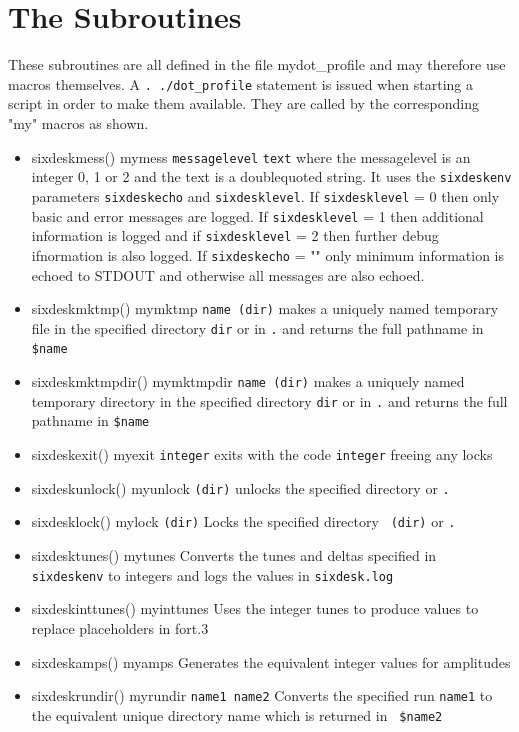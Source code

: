 \documentclass{cernatsnote}
\begin{document}
\section{The Subroutines}
These subroutines are all defined in the file mydot\_profile and may therefore
use macros themselves. A \texttt{. ./dot\_profile} statement is issued when
starting a script in order to make them available.  They are called by the
corresponding "my" macros as shown.
\begin{itemize}
\item sixdeskmess() mymess \texttt{messagelevel} \texttt{text}
where the messagelevel is an integer 0, 1 or 2 and the text is 
a doublequoted string. It uses the \texttt{sixdeskenv} parameters 
\texttt{sixdeskecho} and \texttt{sixdesklevel}. 
If \texttt{sixdesklevel} =  0 then only basic and error messages are logged.
If \texttt{sixdesklevel} = 1 then additional information is logged and if
\texttt{sixdesklevel} = 2 then further debug ifnormation is also logged.
If \texttt{sixdeskecho}  = "" only minimum information is echoed to STDOUT
and otherwise all messages are also echoed.
\item sixdeskmktmp() mymktmp \texttt{name (dir)} makes a uniquely named temporary
  file in the specified directory \texttt{dir} or in \texttt{.} and returns the full
  pathname in \texttt{\$name} 
\item sixdeskmktmpdir() mymktmpdir \texttt{name (dir)} makes a uniquely named
  temporary directory in the specified directory \texttt{dir} or in \texttt{.} and
  returns the full pathname in \texttt{\$name}
\item sixdeskexit() myexit \texttt{integer} exits with the code \texttt{integer}
  freeing any locks
\item sixdeskunlock() myunlock \texttt{(dir)} unlocks the specified directory or
  \texttt{.}
\item sixdesklock() mylock \texttt{(dir)} Locks the specified directory {\tt
  (dir)} or \texttt{.}
\item sixdesktunes() mytunes Converts the tunes and deltas specified in {\tt
  sixdeskenv} to integers and logs the values in \texttt{sixdesk.log} 
\item sixdeskinttunes() myinttunes Uses the integer tunes to produce values to
  replace placeholders in fort.3
\item sixdeskamps() myamps Generates the equivalent integer values for
  amplitudes
\item sixdeskrundir() myrundir \texttt{name1 name2} Converts the specified run
  \texttt{name1} to the equivalent unique directory name which is returned in {\tt
  \$name2}
\end{itemize}
\end{document}
